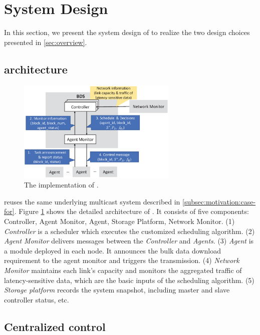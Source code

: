\section{System Design}
\label{sec:system}

In this section, we present the system design of \name to realize the two design choices presented in \Section\ref{sec:overview}.

\subsection{\name architecture}
\label{subsec:system:architecture}

\begin{figure}[t]
  \centering
  \includegraphics[width=3in]{images/implementation_v2.eps}
  \caption{The implementation of \name.}
  \label{fig:implementation}
\end{figure}

\name reuses the same underlying multicast system described in \Section\ref{subsec:motivation:case-for}. Figure \ref{fig:implementation} shows the detailed architecture of \name. It consists of five components: Controller, Agent Monitor, Agent, Storage Platform, Network Monitor. (1) \emph{Controller} is a scheduler which executes the customized scheduling algorithm. (2) \emph{Agent Monitor} delivers messages between the \emph{Controller} and \emph{Agents}. (3) \emph{Agent} is a module deployed in each node. It announces the bulk data download requirement to the agent monitor and triggers the transmission. (4) \emph{Network Monitor} maintains each link's capacity and monitors the aggregated traffic of latency-sensitive data, which are the basic inputs of the scheduling algorithm. (5) \emph{Storage platform} records the system snapshot, including master and slave controller status, etc.

\subsection{Centralized control}
\label{subsec:system:centralized}

